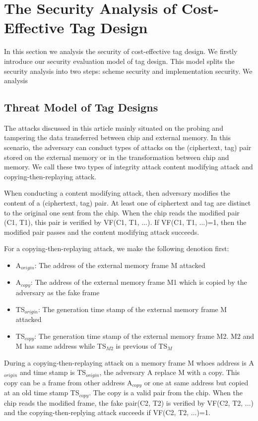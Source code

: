 \documentclass{article}
\begin{document}
\section{The Security Analysis of Cost-Effective Tag Design}
In this section we analysis the security of cost-effective tag design. We firstly introduce our security evaluation model of tag design. This model splits the security analysis into two steps: scheme security and implementation security. We analysis 
\subsection{Threat Model of Tag Designs}
The attacks discussed in this article mainly situated on the probing and
tampering the data transferred between chip and external memory. In this scenario, the adversary can conduct types of attacks on the (ciphertext, tag) pair stored on the external memory or in the transformation between chip and memory. We call these two types of integrity attack content modifying attack and copying-then-replaying attack. 

When conducting a content modifying attack, then adversary modifies the content of a (ciphertext, tag) pair. At least one of ciphertext and tag are distinct to the original one sent from the chip. When the chip reads the modified pair (C1, T1), this pair is verified by VF(C1, T1, $\ldots$). If VF(C1, T1, $\ldots$)=1, then the modified pair passes and the content modifying attack succeeds. 

For a copying-then-replaying attack, we make the following denotion first:
\begin{itemize}
	\item A$_{origin}$: The address of the external memory frame M attacked 
	\item A$_{copy}$: The address of the external memory frame M1 which is copied by the adversary as the fake frame
	\item TS$_{origin}$: The generation time stamp of the external memory frame M attacked
	\item TS$_{copy}$: The generation time stamp of the external memory frame M2. M2 and M has same address while TS$_{M2}$ is previous of TS$_M$ 
\end{itemize}
During a copying-then-replaying attack on a memory frame M whoes address is A$_{origin}$ and time stamp is TS$_{origin}$, the adversary A replace M with a copy. This copy can be a frame from other address A$_{copy}$ or one at same address but copied at an old time stamp TS$_{copy}$. The copy is a valid pair from the chip. 
When the chip reads the modified frame, the fake pair(C2, T2) is verified by VF(C2, T2, $\ldots$) and the copying-then-replying attack succeeds if VF(C2, T2, $\ldots$)=1.  
\end{document}
